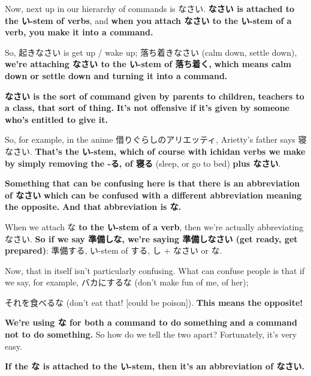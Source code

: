 Now, next up in our hierarchy of commands is なさい. {\bf なさい is attached to the い-stem of verbs}, and {\bf when you attach なさい to the い-stem of a verb, you make it into a command.}

{}

So, 起きなさい is get up / wake up; 落ち着きなさい (calm down, settle down), {\bf we're attaching なさい to the い-stem of 落ち着く,} {\bf which means calm down or settle down and turning it into a command.}

\thinrule

{\bf なさい is the sort of command given by parents to children,} {\bf teachers to a class, that sort of thing.} {\bf It's not offensive if it's given by someone who's entitled to give it.}

\thinrule

So, for example, in the anime 借りぐらしのアリエッティ, Arietty's father says 寝なさい. {\bf That's the い-stem, which of course with ichidan verbs we make by simply} {\bf removing the -る, of 寝る} (sleep, or go to bed) {\bf plus なさい}.

\startsectionlevel[title={な - the abbreviation of なさい},reference={な---the-abbreviation-of-なさい}]

{\bf Something that can be confusing here is that there is an abbreviation of なさい} {\bf which can be confused with a different abbreviation meaning the opposite.} {\bf And that abbreviation is な.}

When we attach な {\bf to the い-stem of a verb}, then we're actually abbreviating なさい. {\bf So if we say 準備しな, we're saying 準備しなさい (get ready, get prepared)}: 準備する, い-stem of する, し + なさい or な.

{}

Now, that in itself isn't particularly confusing. What can confuse people is that if we say, for example, バカにするな (don't make fun of me, of her);

{}

それを食べるな (don't eat that! {[}could be poison{]}). {\bf This means the opposite!}

{\bf We're using な for both a command to do something} {\bf and a command not to do something.} So how do we tell the two apart? Fortunately, it's very easy.

{\bf If the な is attached to the い-stem, then it's an abbreviation of なさい.}

